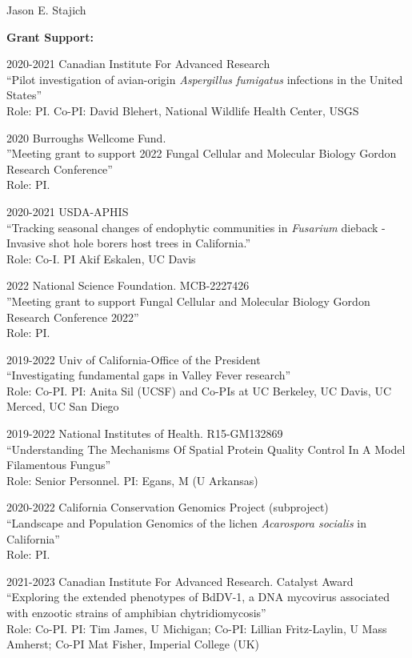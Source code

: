 \documentclass[10pt]{article}
\begin{document}
\begin{cv}{\centerline{Jason E. Stajich}}
\begin{cvlistcompact}{\bf Grant Support:}
\item [2020-2021] Canadian Institute For Advanced Research \\
  ``Pilot investigation of avian-origin \textit{Aspergillus fumigatus} infections
in the United States'' \\
Role: PI. Co-PI: David Blehert, National Wildlife Health Center, USGS

\item [2020] Burroughs Wellcome Fund. \\
''Meeting grant to support 2022 Fungal Cellular and Molecular Biology Gordon Research Conference'' \\
Role: PI.

\item [2020-2021] USDA-APHIS \\
``Tracking seasonal changes of endophytic communities in \textit{Fusarium} dieback - Invasive shot hole borers host trees in California.'' \\
Role: Co-I. PI Akif Eskalen, UC Davis

\item [2022] National Science Foundation. MCB-2227426 \\
''Meeting grant to support Fungal Cellular and Molecular Biology Gordon Research Conference 2022'' \\
Role: PI.

\item [2019-2022] Univ of California-Office of the President \\
``Investigating fundamental gaps in Valley Fever research'' \\
Role: Co-PI.  PI: Anita Sil (UCSF) and Co-PIs at UC Berkeley, UC
Davis, UC Merced, UC San Diego

\item [2019-2022] National Institutes of Health. R15-GM132869 \\
  ``Understanding The Mechanisms Of Spatial Protein Quality Control In A Model Filamentous Fungus'' \\
Role: Senior Personnel. PI: Egans, M (U Arkansas)

\item [2020-2022] California Conservation Genomics Project (subproject) \\
  ``Landscape and Population Genomics of the lichen \textit{Acarospora socialis} in California''  \\
Role: PI.

\item [2021-2023] Canadian Institute For Advanced Research. Catalyst Award \\
  ``Exploring the extended phenotypes of BdDV-1, a DNA mycovirus associated with enzootic strains of amphibian chytridiomycosis'' \\
Role: Co-PI. PI: Tim James, U Michigan; Co-PI: Lillian Fritz-Laylin, U Mass Amherst; Co-PI Mat Fisher, Imperial College (UK)


\end{cvlistcompact}
\end{cv}
\end{document}
